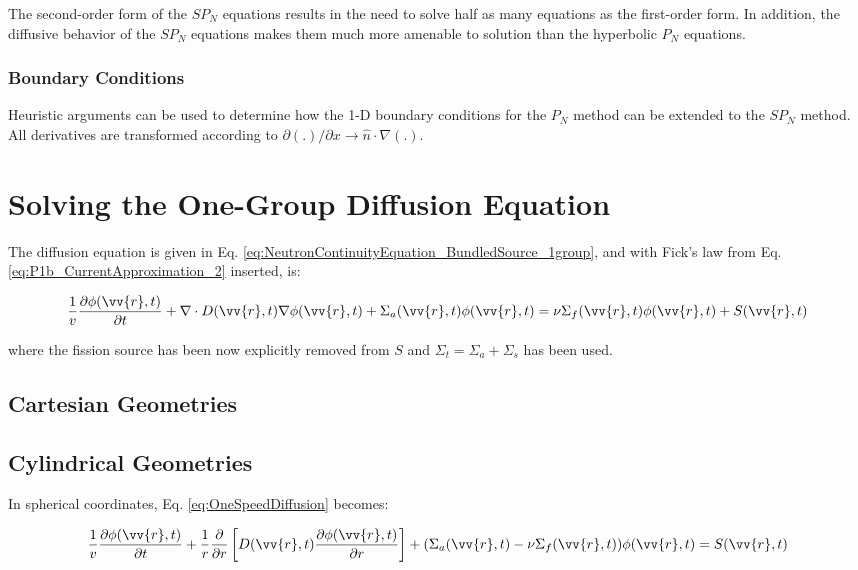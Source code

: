 \documentclass[10pt]{article}
\begin{document}
\begin{flushleft}
The second-order form of the \(SP_N\) equations results in the need to solve half as many equations as the first-order form. In addition, the diffusive behavior of the \(SP_N\) equations makes them much more amenable to solution than the hyperbolic \(P_N\) equations. 

\subsubsection{Boundary Conditions}

Heuristic arguments can be used to determine how the 1-D boundary conditions for the \(P_N\) method can be extended to the \(SP_N\) method. All derivatives are transformed according to \(\partial(.)/\partial x\rightarrow\hat{n}\cdot\nabla(.)\). 

\clearpage




\section{Solving the One-Group Diffusion Equation}

The diffusion equation is given in Eq. \eqref{eq:NeutronContinuityEquation_BundledSource_1group}, and with Fick's law from Eq. \eqref{eq:P1b_CurrentApproximation_2} inserted, is:

\begin{equation}
\label{eq:OneSpeedDiffusion}
\frac{1}{v} \frac{\partial\phi(\vv{r}, t)}{\partial t} +\nabla\cdot D(\vv{r}, t)\nabla\phi(\vv{r},t) + \Sigma_a(\vv{r},t)\phi(\vv{r}, t) = \nu\Sigma_f(\vv{r},t)\phi(\vv{r},t)+ S(\vv{r}, t)
\end{equation}

where the fission source has been now explicitly removed from \(S\) and \(\Sigma_t=\Sigma_a+\Sigma_s\) has been used. 

\subsection{Cartesian Geometries}

\subsection{Cylindrical Geometries}

In spherical coordinates, Eq. \eqref{eq:OneSpeedDiffusion} becomes:

\begin{equation}
\label{eq:OneSpeedDiffusionCylindrical}
\frac{1}{v} \frac{\partial\phi(\vv{r}, t)}{\partial t} +\frac{1}{r}\frac{\partial}{\partial r}\left\lbrack D(\vv{r},t)\frac{\partial\phi(\vv{r},t)}{\partial r}\right\rbrack + (\Sigma_a(\vv{r},t)-\nu\Sigma_f(\vv{r},t))\phi(\vv{r}, t) = S(\vv{r}, t)
\end{equation}


\end{flushleft}
\end{document}
